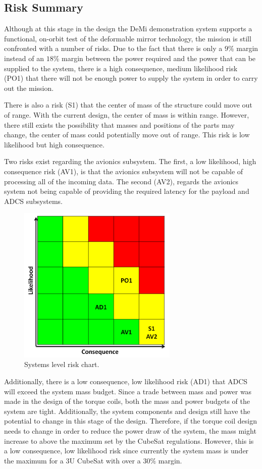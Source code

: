 \documentclass[12pt]{article}
\begin{document}
		\subsection{Risk Summary}
Although at this stage in the design the DeMi demonstration system supports a functional, on-orbit test of the deformable mirror technology, the mission is still confronted with a number of risks.  Due to the fact that there is only a $9\%$ margin instead of an $18\%$ margin between the power required and the power that can be supplied to the system, there is a high consequence, medium likelihood risk (PO1) that there will not be enough power to supply the system in order to carry out the mission.

There is also a risk (S1) that the center of mass of the structure could move out of range.  With the current design, the center of mass is within range.  However, there still exists the possibility that masses and positions of the parts may change, the center of mass could potentially move out of range.  This risk is low likelihood but high consequence.

Two risks exist regarding the avionics subsystem.  The first, a low likelihood, high consequence risk (AV1), is that the avionics subsystem will not be capable of processing all of the incoming data.  The second (AV2), regards the avionics system not being capable of providing the required latency for the payload and ADCS subsystems. 

\begin{figure}[ht]
\centering
\includegraphics[width=3in]{images/conclusion_1.png}
\caption{Systems level risk chart.}
\label{fig:risk_chart}
\end{figure}

Additionally, there is a low consequence, low likelihood risk (AD1) that ADCS will exceed the system mass budget.  Since a trade between mass and power was made in the design of the torque coils, both the mass and power budgets of the system are tight.  Additionally, the system components and design still have the potential to change in this stage of the design.  Therefore, if the torque coil design needs to change in order to reduce the power draw of the system, the mass might increase to above the maximum set by the CubeSat regulations.  However, this is a low consequence, low likelihood risk since currently the system mass is under the maximum for a 3U CubeSat with over a $30\%$ margin.
\end{document}
